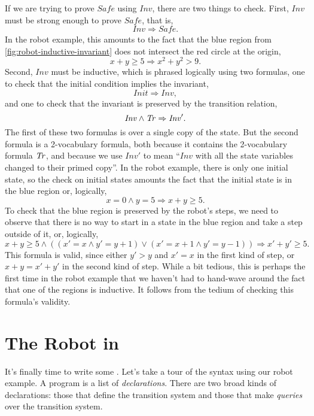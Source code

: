 If we are trying to prove $\mathit{Safe}$ using $\mathit{Inv}$,
  there are two things to check.
First, $\mathit{Inv}$ must be strong enough
  to prove $\mathit{Safe}$,
  that is,
\[
  \mathit{Inv} \Rightarrow \mathit{Safe}.
\]
In the robot example, this amounts to the fact that
  the blue region from \cref{fig:robot-inductive-invariant}
  does not intersect the red circle at the origin,
\[
  x + y \ge 5 \Rightarrow x^2 + y^2 > 9.
\]
Second, $\mathit{Inv}$ must be inductive,
  which is phrased logically using two formulas,
one to check that the initial condition implies the invariant,
\[
  \mathit{Init} \Rightarrow \mathit{Inv},
\]
and one to check that the invariant is preserved by the transition relation,
\[
  \mathit{Inv} \land \mathit{Tr} \Rightarrow \mathit{Inv}'.
\]
The first of these two formulas is over a single copy of the state.
But the second formula is a 2-vocabulary formula,
  both because it contains the 2-vocabulary formula $\mathit{Tr}$,
  and because we use $\mathit{Inv}'$ to mean ``$\mathit{Inv}$
  with all the state variables changed to their primed copy''.
In the robot example, there is only one initial state,
  so the check on initial states amounts the fact that
  the initial state is in the blue region
  or, logically,
\[
  x = 0 \land y = 5 \Rightarrow x + y \ge 5.
\]
To check that the blue region is preserved by the robot's steps,
  we need to observe that there is no way to start in a state in the blue region
  and take a step outside of it,
  or, logically,
\[
  x + y \ge 5 \land ((x' = x \land y' = y + 1) \lor
                     (x' = x + 1 \land y' = y - 1)) \Rightarrow
  x' + y' \ge 5.
\]
This formula is valid, since
  either $y' > y$ and $x' = x$ in the first kind of step,
  or $x + y = x' + y'$ in the second kind of step.
While a bit tedious, this is perhaps the first time in the robot example
  that we haven't had to hand-wave around
  the fact that one of the regions is inductive.
It follows from the tedium of checking this formula's validity.

\section{The Robot in \mypyvy}

It's finally time to write some \mypyvy.
Let's take a tour of the syntax using our robot example.
A \mypyvy program is a list of \emph{declarations}.
There are two broad kinds of declarations:
  those that define the transition system
  and those that make \emph{queries} over the transition system.

